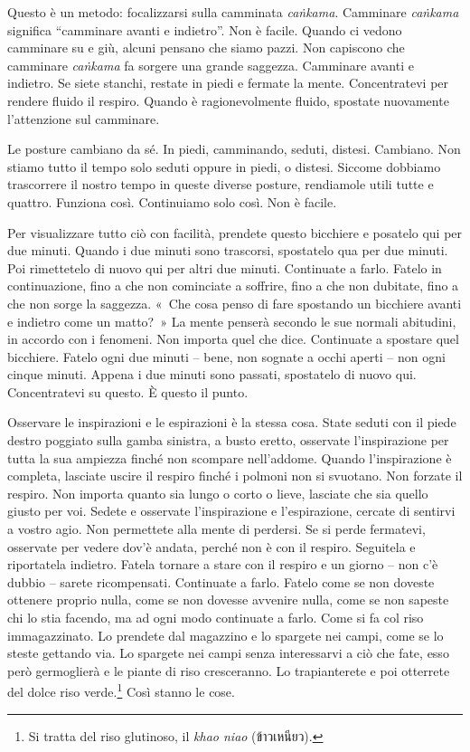 Questo è un metodo: focalizzarsi sulla camminata \emph{caṅkama}.
Camminare \emph{caṅkama} significa ``camminare avanti e indietro''. Non
è facile. Quando ci vedono camminare su e giù, alcuni pensano che siamo
pazzi. Non capiscono che camminare \emph{caṅkama} fa sorgere una grande
saggezza. Camminare avanti e indietro. Se siete stanchi, restate in
piedi e fermate la mente. Concentratevi per rendere fluido il respiro.
Quando è ragionevolmente fluido, spostate nuovamente l'attenzione sul
camminare.

Le posture cambiano da sé. In piedi, camminando, seduti, distesi.
Cambiano. Non stiamo tutto il tempo solo seduti oppure in piedi, o
distesi. Siccome dobbiamo trascorrere il nostro tempo in queste diverse
posture, rendiamole utili tutte e quattro. Funziona così. Continuiamo
solo così. Non è facile.

Per visualizzare tutto ciò con facilità, prendete questo bicchiere e
posatelo qui per due minuti. Quando i due minuti sono trascorsi,
spostatelo qua per due minuti. Poi rimettetelo di nuovo qui per altri
due minuti. Continuate a farlo. Fatelo in continuazione, fino a che non
cominciate a soffrire, fino a che non dubitate, fino a che non sorge la
saggezza. «~Che cosa penso di fare spostando un bicchiere avanti e
indietro come un matto?~» La mente penserà secondo le sue normali
abitudini, in accordo con i fenomeni. Non importa quel che dice.
Continuate a spostare quel bicchiere. Fatelo ogni due minuti -- bene,
non sognate a occhi aperti -- non ogni cinque minuti. Appena i due
minuti sono passati, spostatelo di nuovo qui. Concentratevi su questo. È
questo il punto.

Osservare le inspirazioni e le espirazioni è la stessa cosa. State
seduti con il piede destro poggiato sulla gamba sinistra, a busto
eretto, osservate l'inspirazione per tutta la sua ampiezza finché non
scompare nell'addome. Quando l'inspirazione è completa, lasciate uscire
il respiro finché i polmoni non si svuotano. Non forzate il respiro. Non
importa quanto sia lungo o corto o lieve, lasciate che sia quello giusto
per voi. Sedete e osservate l'inspirazione e l'espirazione, cercate di
sentirvi a vostro agio. Non permettete alla mente di perdersi. Se si
perde fermatevi, osservate per vedere dov'è andata, perché non è con il
respiro. Seguitela e riportatela indietro. Fatela tornare a stare con il
respiro e un giorno -- non c'è dubbio -- sarete ricompensati. Continuate
a farlo. Fatelo come se non doveste ottenere proprio nulla, come se non
dovesse avvenire nulla, come se non sapeste chi lo stia facendo, ma ad
ogni modo continuate a farlo. Come si fa col riso immagazzinato. Lo
prendete dal magazzino e lo spargete nei campi, come se lo steste
gettando via. Lo spargete nei campi senza interessarvi a ciò che fate,
esso però germoglierà e le piante di riso cresceranno. Lo trapianterete
e poi otterrete del dolce riso verde.\footnote{Si tratta del riso
  glutinoso, il \emph{khao niao} (ข้าวเหนียว).} Così stanno le cose.

